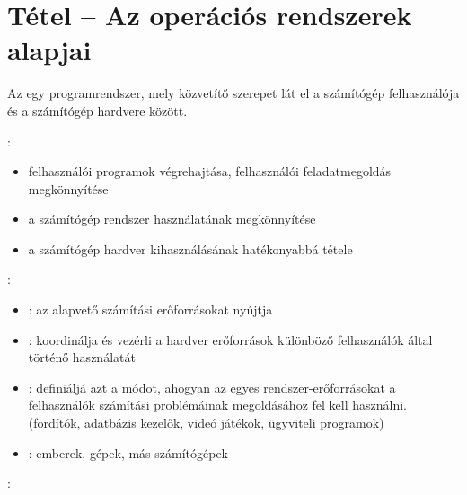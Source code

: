\documentclass[main.tex]{subfiles}
\begin{document}
  \section{Tétel – Az operációs rendszerek alapjai} %
  
  Az  egy programrendszer,
  mely közvetítő szerepet lát el a számítógép felhasználója
  és a számítógép hardvere között.
  
  \vspace{1em}
  {\large {}:}
  \begin{itemize}
    \item felhasználói programok végrehajtása,
    felhasználói feladatmegoldás megkönnyítése

    \item a számítógép rendszer használatának
    megkönnyítése

    \item a számítógép hardver kihasználásának
    hatékonyabbá tétele
  \end{itemize}

  {\large {}:}
  \begin{itemize}
    \item {}:
    az alapvető számítási erőforrásokat nyújtja
    
    \item {}:
    koordinálja és vezérli a hardver erőforrások
    különböző felhasználók által történő használatát

    \item {}:
    definiáljá azt a módot, ahogyan az egyes
    rendszer-erőforrásokat a felhasználók számítási
    problémáinak megoldásához fel kell használni.
    (fordítók, adatbázis kezelők,
    videó játékok, ügyviteli programok)

    \item {}:
    emberek, gépek, más számítógépek
  \end{itemize}

  {\large {}:}
  \vspace{1em}
\end{document}

